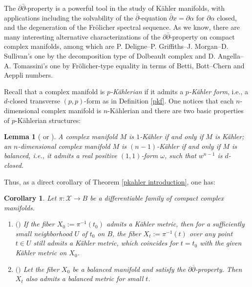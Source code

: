 \documentclass[12pt]{amsart}
\numberwithin{equation}{section}
\newtheorem{corollary}  [theorem]     {Corollary}
\newtheorem{lemma}  [theorem]     {Lemma}
\theoremstyle{definition}
\theoremstyle{definition}
\theoremstyle{definition}
\renewcommand{\1}{\mathsf{1}}
\newcommand{\db}{\overline{\partial}}
\renewcommand{\>}{\rightarrow}
\newcommand{\p}{\partial}
\def\p{\partial}
\theoremstyle{plain} %
\theoremstyle{plain} %
\theoremstyle{plain} %
\begin{document}
	
The $\partial\bar{\partial}$-property is a powerful tool in the study of K\"ahler manifolds, with applications including the solvability of the $\bar{\partial}$-equation $\bar{\partial}x = \partial\alpha$ for $\partial\alpha$ closed, and the degeneration of the Fr\"olicher spectral sequence.  As we know, there are many interesting alternative characterizations of the $\partial \bar{\partial}$-property on compact complex manifolds, among which are P. Deligne--P. Griffiths--J. Morgan--D. Sullivan's  one  \cite{DGMS75} by the decomposition type of Dolbeault complex  and D. Angella--A. Tomassini's one \cite{AT13} by Fr\"olicher-type equality in terms of Betti, Bott--Chern and Aeppli numbers.
	
	
Recall that  a complex manifold is \textit{$p$-K\"{a}hlerian} if it admits a  \textit{$p$-K\"{a}hler form}, i.e., a $d$-closed transverse $(p,p)$-form as in Definition \ref{pkf}. One notices that each $n$-dimensional complex manifold is $n$-K\"ahlerian and there are two basic properties of $p$-K\"ahlerian structures:
	\begin{lemma}[{\cite[Proposition 1.15]{AA87} or  \cite[Corollary 4.6]{RWZ21}}]\label{pkb}
		A complex manifold $M$ is $1$-K\"ahler if and only if $M$ is
		K\"ahler;  an $n$-dimensional complex manifold $M$ is $(n-1)$-K\"ahler if and only if $M$ is  {balanced}, i.e., it admits a real positive $(1,1)$-form $\omega$, such that $w^{n-1}$ is $d$-closed.
	\end{lemma}
	
	Thus, as a direct corollary of Theorem \ref{pkahler introduction}, one has:
	\begin{corollary}\label{cor-mt}
		Let $\pi: \mathcal{X} \rightarrow B$ be a differentiable family of compact complex manifolds.
		\begin{enumerate}[$(i)$]
			\item {{ {\textbf{$($\cite[Theorem 15]{KS60}$)$}}}\label{stab-Kahler}
				If the fiber $X_0:= \pi^{-1}(t_0)$ admits a K\"ahler metric, then for a sufficiently small neighborhood $U$ of $t_0$ on $B$, the fiber $X_t:=\pi^{-1}(t)$ over any point $t\in U$ still admits a K\"ahler metric, which coincides for $t=t_0$ with the given K\"ahler metric on $X_0$.}
			\item{$($\cite[Theorem 5.13]{Wu06}$)$} \label{balanced-Kahler}
			Let the fiber $X_0$ be a balanced manifold and satisfy the  $\p\db$-property. Then $X_t$ also admits a balanced metric for small $t$.
		\end{enumerate}
	\end{corollary}
	
\end{document}
